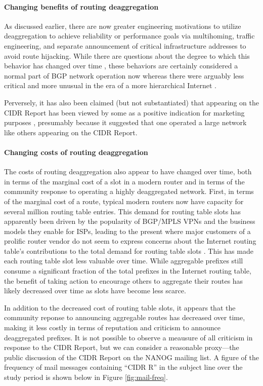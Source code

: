 \paragraph{Changing benefits of routing deaggregation}
As discussed earlier, there are now greater engineering motivations to utilize
deaggregation to achieve reliability or performance goals via multihoming,
traffic engineering, and separate announcement of critical infrastructure
addresses to avoid route hijacking. While there are questions about the degree
to which this behavior has changed over time \cite{Cittadini:2010pi}, these
behaviors are certainly considered a normal part of BGP network operation now
whereas there were arguably less critical and more unusual in the era of a more
hierarchical Internet \cite{Labovitz:2010zr}.

Perversely, it has also been claimed (but not substantiated) that appearing on
the CIDR Report has been viewed by some as a positive indication for marketing
purposes \cite{Smith:2006vn}, presumably because it suggested that one operated
a large network like others appearing on the CIDR Report.

\paragraph{Changing costs of routing deaggregation}
The costs of routing deaggregation also appear to have changed over time, both
in terms of the marginal cost of a slot in a modern router and in terms of the
community response to operating a highly deaggregated network. First, in terms
of the marginal cost of a route, typical modern routers now have capacity for
several million routing table entries. This demand for routing table slots has
apparently been driven by the popularity of BGP/MPLS VPNs \cite{rfc2547} and the
business models they enable for ISPs, leading to the present where major
customers of a prolific router vendor do not seem to express concerns about the
Internet routing table's contributions to the total demand for routing table
slots \cite{Davie:2011uq}. This has made each routing table slot less valuable
over time. While aggregable prefixes still consume a significant fraction
of the total prefixes in the Internet routing table, the benefit of taking
action to encourage others to aggregate their routes has likely decreased over
time as slots have become less scarce.

In addition to the decreased cost of routing table slots, it appears that the
community reponse to announcing aggregable routes has decreased over time,
making it less costly in terms of reputation and criticism to announce
deaggregated prefixes. It is not possible to observe a meausure of all
criticism in response to the CIDR Report, but we can consider a reasonable
proxy---the public discussion of the CIDR Report on the NANOG mailing list. A
figure of the frequency of mail messages containing ``CIDR R'' in the subject
line over the study period is shown below in Figure \ref{fig:mail-freq}.

